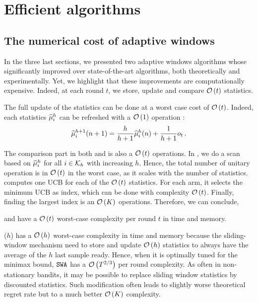 \section{Efficient algorithms}
\label{app:efficient_alg}
\subsection{The numerical cost of adaptive windows}

In the three last sections, we presented two adaptive windows algorithms whose significantly improved over state-of-the-art algorithms, both theoretically and experimentally. Yet, we highlight that these improvements are computationally expensive. Indeed, at each round $t$, we store, update and compare $\mathcal{O}\left(t\right)$ statistics. 

The full update of the statistics can be done at a worst case cost of $\mathcal{O}\left(t\right)$. Indeed, each statistics $\widehat{\mu}_i^h$ can be refreshed with a $\mathcal{O}\left(1\right)$ operation : 
\[\widehat{\mu}_i^{h+1}(n+1) = \frac{h}{h+1}\widehat{\mu}_i^{h}(n) + \frac{1}{h+1}o_t \,. \]

The comparison part in both \FEWA and \RUCB is also a $\mathcal{O}\left(t\right)$ operations. In \FEWA , we do a scan based on $\widehat{\mu}_i^{h}$ for all $i \in \mathcal{K}_h$ with increasing $h$. Hence, the total number of unitary operation is in $\mathcal{O}\left(t\right)$ in the worst case, as it scales with the number of statistics. \RUCB computes one UCB for each of the $\mathcal{O}\left(t\right)$ statistics. For each arm, it selects the minimum UCB as index, which can be done with complexity $\mathcal{O}\left(t\right)$. Finally, finding the largest index is an $\mathcal{O}\left(K\right)$ operations. Therefore, we can conclude,

\begin{proposition}
\FEWA and \RUCB have a $\mathcal{O}\left(t\right)$ worst-case complexity per round $t$ in time and memory.
\end{proposition}

\begin{remark}
\SWA($h$) has a $\mathcal{O}\left(h\right)$ worst-case complexity in time and memory because the sliding-window mechanism need to store and update $\mathcal{O}\left(h\right)$ statistics to always have the average of the $h$ last sample ready. Hence, when it is optimally tuned for the minimax bound, $\normalfont \texttt{SWA}$ has a $\mathcal{O}\left(T^{2/3}\right)$ per round complexity. As often in non-stationary bandits, it may be possible to replace sliding window statistics by discounted statistics. Such modification often leads to slightly worse theoretical regret rate but to a much better $\mathcal{O}\left(K\right)$ complexity. 
\end{remark}

